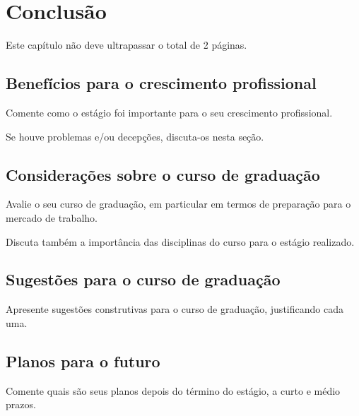 \chapter{Conclusão}\label{chap:conclusao}

Este capítulo não deve ultrapassar o total de 2 páginas.

\section{Benefícios para o crescimento profissional}

Comente como o estágio foi importante para o seu crescimento profissional.

Se houve problemas e/ou decepções, discuta-os nesta seção.


\section{Considerações sobre o curso de graduação}

Avalie o seu curso de graduação, em particular em termos de preparação para o mercado de trabalho.

Discuta também a importância das disciplinas do curso para o estágio realizado.

\section{Sugestões para o curso de graduação}

Apresente sugestões construtivas para o curso de graduação, justificando cada uma.

\section{Planos para o futuro}

Comente quais são seus planos depois do término do estágio, a curto e médio prazos.
